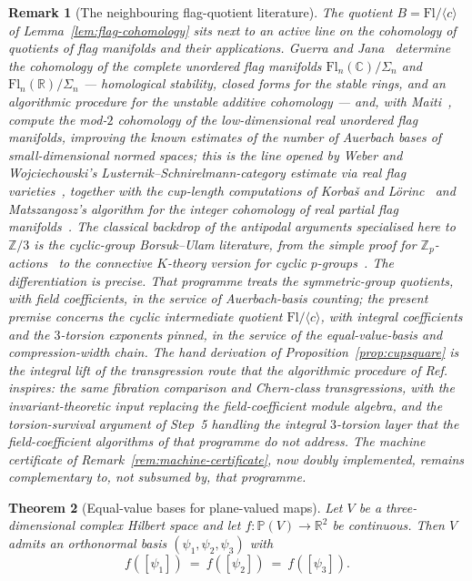 \documentclass[11pt,a4paper]{article}
\newtheorem{theorem}{Theorem}[section]
\newtheorem{remark}[theorem]{Remark}
\begin{document}
\begin{remark}[The neighbouring flag-quotient literature]
\label{rem:flag-literature}
The quotient $B=\mathrm{Fl}/\langle c\rangle$ of Lemma~\ref{lem:flag-cohomology}
sits next to an active line on the cohomology of quotients of flag manifolds
and their applications. Guerra and Jana~\cite{GuerraJana2025} determine the
cohomology of the complete unordered flag manifolds
$\mathrm{Fl}_n(\mathbb C)/\Sigma_n$ and $\mathrm{Fl}_n(\mathbb R)/\Sigma_n$
--- homological stability, closed forms for the stable rings, and an
algorithmic procedure for the unstable additive cohomology --- and, with
Maiti~\cite{GuerraJanaMaiti2025}, compute the mod-$2$ cohomology of the
low-dimensional real unordered flag manifolds, improving the known estimates
of the number of Auerbach bases of small-dimensional normed spaces; this is
the line opened by Weber and Wojciechowski's Lusternik--Schnirelmann-category
estimate via real flag varieties~\cite{WeberWojciechowski2017}, together with
the cup-length computations of Korba{\v s} and L\"orinc~\cite{KorbasLorinc2003}
and Matszangosz's algorithm for the integer cohomology of real partial flag
manifolds~\cite{Matszangosz2021}. The classical backdrop of the antipodal
arguments specialised here to $\mathbb Z/3$ is the cyclic-group
Borsuk--Ulam literature, from the simple proof for
$\mathbb Z_p$-actions~\cite{Singh2010} to the connective $K$-theory version
for cyclic $p$-groups~\cite{Crabb2022}. The differentiation is precise. That
programme treats the \emph{symmetric-group} quotients, with \emph{field}
coefficients, in the service of Auerbach-basis counting; the present premise
concerns the \emph{cyclic} intermediate quotient
$\mathrm{Fl}/\langle c\rangle$, with \emph{integral} coefficients and the
$3$-torsion exponents pinned, in the service of the equal-value-basis and
compression-width chain. The hand derivation of Proposition~\ref{prop:cupsquare} is the
integral lift of the transgression route that the algorithmic procedure of
Ref.~\cite{GuerraJana2025} inspires: the same fibration comparison and
Chern-class transgressions, with the invariant-theoretic input replacing the
field-coefficient module algebra, and the torsion-survival argument of
Step~5 handling the integral $3$-torsion layer that the field-coefficient
algorithms of that programme do not address. The machine certificate of
Remark~\ref{rem:machine-certificate}, now doubly implemented, remains
complementary to, not subsumed by, that programme.
\end{remark}

\begin{theorem}[Equal-value bases for plane-valued maps]
\label{thm:equal-basis-plane}
Let $V$ be a three-dimensional complex Hilbert space and let
$f\colon\mathbb P(V)\to\mathbb R^2$ be continuous. Then $V$ admits an
orthonormal basis $(\psi_1,\psi_2,\psi_3)$ with
\[
f([\psi_1])\ =\ f([\psi_2])\ =\ f([\psi_3]).
\]
\end{theorem}
\end{document}
